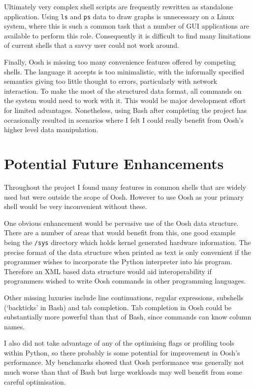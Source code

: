 \documentclass[12pt,twoside,notitlepage]{report}
\begin{document}
Ultimately very complex shell scripts are frequently rewritten as
standalone application. Using {\tt ls} and {\tt ps} data to draw
graphs is unnecessary on a Linux system, where this is such a common
task that a number of GUI applications are available to perform this
role. Consequently it is difficult to find many limitations of current
shells that a savvy user could not work around.

Finally, Oosh is missing too many convenience features offered by
competing shells. The language it accepts is too minimalistic, with
the informally specified semantics giving too little thought to
errors, particularly with network interaction. To make the most of the
structured data format, all commands on the system would need to work
with it. This would be major development effort for limited
advantages. Nonetheless, using Bash after completing the project has
occasionally resulted in scenarios where I felt I could really benefit
from Oosh's higher level data manipulation.

\section{Potential Future Enhancements}
Throughout the project I found many features in common shells that are
widely used but were outside the scope of Oosh. However to use Oosh as
your primary shell would be very inconvenient without these.

One obvious enhancement would be pervasive use of the Oosh data
structure. There are a number of areas that would benefit from this,
one good example being the {\tt /sys} directory which holds kernel
generated hardware information. The precise format of the data
structure when printed as text is only convenient if the programmer
wishes to incorporate the Python interpreter into his
program. Therefore an XML based data structure would aid
interoperability if programmers wished to write Oosh commands in other
programming languages.

Other missing luxuries include line continuations, regular
expressions, subshells (`backticks' in Bash) and tab completion. Tab
completion in Oosh could be substantially more powerful than that of
Bash, since commands can know column names.

I also did not take advantage of any of the optimising flags or
profiling tools within Python, so there probably is some potential for
improvement in Oosh's performance. My benchmarks showed that Oosh
performance was generally not much worse than that of Bash but large
workloads may well benefit from some careful optimisation.
\end{document}
